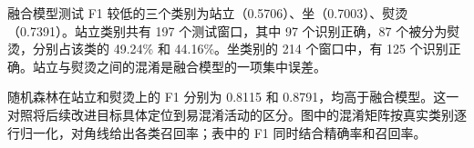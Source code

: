融合模型测试 F1 较低的三个类别为站立（0.5706）、坐（0.7003）、熨烫（0.7391）。站立类别共有 197 个测试窗口，其中 97 个识别正确，87 个被分为熨烫，分别占该类的 49.24\% 和 44.16\%。坐类别的 214 个窗口中，有 125 个识别正确。站立与熨烫之间的混淆是融合模型的一项集中误差。

随机森林在站立和熨烫上的 F1 分别为 0.8115 和 0.8791，均高于融合模型。这一对照将后续改进目标具体定位到易混淆活动的区分。图中的混淆矩阵按真实类别逐行归一化，对角线给出各类召回率；表中的 F1 同时结合精确率和召回率。